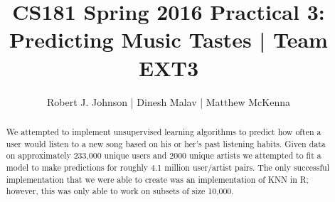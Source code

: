 \documentclass{article}
\begin{document}
\title{CS181 Spring 2016 Practical 3: Predicting Music Tastes | Team EXT3}
\author{Robert J. Johnson | Dinesh Malav | Matthew McKenna}


\maketitle

\begin{abstract}
We attempted to implement unsupervised learning algorithms to predict how often a user would listen to a new song based on his or her's past listening habits. Given data on approximately 233,000 unique users and 2000 unique artists we attempted to fit a model to make predictions for roughly 4.1 million user/artist pairs. The only successful implementation that we were able to create was an implementation of KNN in R; however, this was only able to work on subsets of size 10,000. 
\end{abstract}
\end{document}
